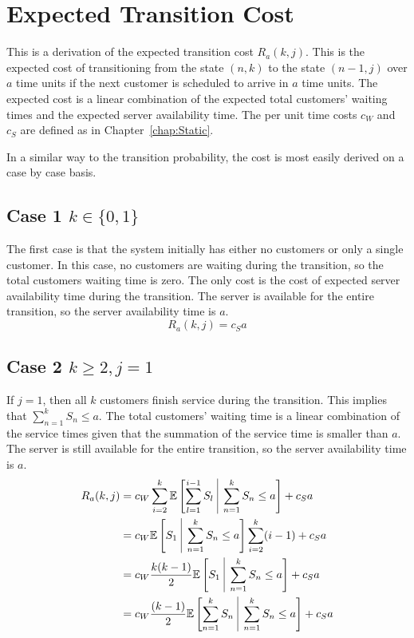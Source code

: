 \section{Expected Transition Cost}
This is a derivation of the expected transition cost $R_{a} (k, j)$. This is the expected cost of transitioning from the state $(n, k)$ to the state $(n - 1, j)$ over $a$ time units if the next customer is scheduled to arrive in $a$ time units. The expected cost is a linear combination of the expected total customers' waiting times and the expected server availability time. The per unit time costs $c_{W}$ and $c_{S}$ are defined as in Chapter~\ref{chap:Static}.

In a similar way to the transition probability, the cost is most easily derived on a case by case basis.

\subsection{Case 1 $k \in \{ 0, 1 \}$}
The first case is that the system initially has either no customers or only a single customer. In this case, no customers are waiting during the transition, so the total customers waiting time is zero. The only cost is the cost of expected server availability time during the transition. The server is available for the entire transition, so the server availability time is $a$.
\begin{equation}
	R_{a} (k, j) = c_{S} a
\end{equation}

\subsection{Case 2 $k \geq 2, j = 1$}
If $j = 1$, then all $k$ customers finish service during the transition. This implies that $\displaystyle \sum_{n = 1}^{k} S_{n} \leq a$. The total customers' waiting time is a linear combination of the service times given that the summation of the service time is smaller than $a$. The server is still available for the entire transition, so the server availability time is $a$.
\begin{equation}
	\begin{split}
		R_{a} (k, j) & = c_{W} \sum_{i = 2}^{k} \mathbb{E} \left[ \sum_{l = 1}^{i - 1} S_{l} \ \vline \ \sum_{n = 1}^{k} S_{n} \leq a \right] + c_{S} a \\
		& = c_{W} \mathbb{E} \left[ S_{1} \ \vline \ \sum_{n = 1}^{k} S_{n} \leq a \right] \sum_{i = 2}^{k} (i - 1) + c_{S} a \\
		& = c_{W} \frac{k (k - 1)}{2} \mathbb{E} \left[ S_{1} \ \vline \ \sum_{n = 1}^{k} S_{n} \leq a \right] + c_{S} a \\
		& = c_{W} \frac{(k - 1)}{2} \mathbb{E} \left[ \sum_{n = 1}^{k} S_{n} \ \vline \ \sum_{n = 1}^{k} S_{n} \leq a \right] + c_{S} a \\
	\end{split}
\end{equation}

